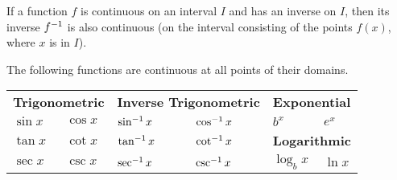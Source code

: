 \documentclass{exam}
\begin{document}
  \begin{thmBox*}
    If a function $f$ is continuous on an interval $I$ and has an inverse on $I$, then its inverse $f^{-1}$ is also continuous (on the interval consisting of the points $f(x)$, where $x$ is in $I$).
  \end{thmBox*}    

  \begin{thmBox*}
    The following functions are continuous at all points of their  domains.
  
    \begin{tabularx}{\linewidth}{*{6}{X}}
      \multicolumn{2}{L}{\textbf{Trigonometric}}& 
      \multicolumn{2}{L}{\textbf{Inverse Trigonometric}}& 
      \multicolumn{2}{L}{\textbf{Exponential}}\\
      $\sin x$& $\cos x$& $\sin^{-1} x$& $\cos^{-1} x$& $b^x$& $e^x$\\
      $\tan x$& $\cot x$& $\tan^{-1} x$& $\cot^{-1} x$& 
      \multicolumn{2}{L}{\textbf{Logarithmic}}\\
      $\sec x$& $\csc x$& $\sec^{-1} x$& $\csc^{-1} x$& $\log_b x$& $\ln x$
    \end{tabularx}
  \end{thmBox*}
\end{document}
